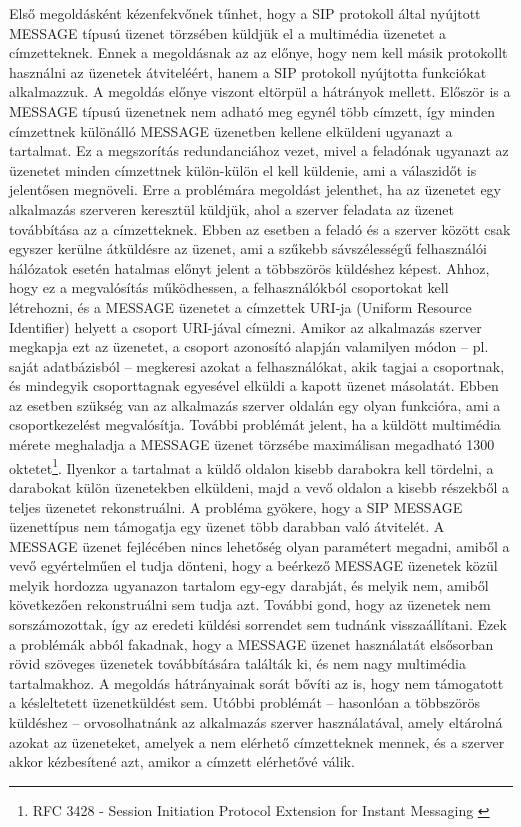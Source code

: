 Első megoldásként kézenfekvőnek tűnhet, hogy a SIP protokoll által nyújtott MESSAGE típusú üzenet törzsében küldjük el a multimédia üzenetet a címzetteknek. Ennek a megoldásnak az az előnye, hogy nem kell másik protokollt használni az üzenetek átviteléért, hanem a SIP protokoll nyújtotta funkciókat alkalmazzuk. A megoldás előnye viszont eltörpül a hátrányok mellett. Először is a MESSAGE típusú üzenetnek nem adható meg egynél több címzett, így minden címzettnek különálló MESSAGE üzenetben kellene elküldeni ugyanazt a tartalmat. Ez a megszorítás redundanciához vezet, mivel a feladónak ugyanazt az üzenetet minden címzettnek külön-külön el kell küldenie, ami a válaszidőt is jelentősen megnöveli. Erre a problémára megoldást jelenthet, ha az üzenetet egy alkalmazás szerveren keresztül küldjük, ahol a szerver feladata az üzenet továbbítása az a címzetteknek. Ebben az esetben a feladó és a szerver között csak egyszer kerülne átküldésre az üzenet, ami a szűkebb sávszélességű felhasználói hálózatok esetén hatalmas előnyt jelent a többszörös küldéshez képest. Ahhoz, hogy ez a megvalósítás működhessen, a felhasználókból csoportokat kell létrehozni, és a MESSAGE üzenetet a címzettek URI-ja (Uniform Resource Identifier) helyett a csoport URI-jával címezni. Amikor az alkalmazás szerver megkapja ezt az üzenetet, a csoport azonosító alapján valamilyen módon -- pl. saját adatbázisból -- megkeresi azokat a felhasználókat, akik tagjai a csoportnak, és mindegyik csoporttagnak egyesével elküldi a kapott üzenet másolatát. Ebben az esetben szükség van az alkalmazás szerver oldalán egy olyan funkcióra, ami a csoportkezelést megvalósítja.
További problémát jelent, ha a küldött multimédia mérete meghaladja a MESSAGE üzenet törzsébe maximálisan megadható 1300 oktetet\footnote{RFC 3428 - Session Initiation Protocol Extension for Instant Messaging \cite{rfc3428}}. Ilyenkor a tartalmat a küldő oldalon kisebb darabokra kell tördelni, a darabokat külön üzenetekben elküldeni, majd a vevő oldalon a kisebb részekből a teljes üzenetet rekonstruálni. A probléma gyökere, hogy a SIP MESSAGE üzenettípus nem támogatja egy üzenet több darabban való átvitelét. A MESSAGE üzenet fejlécében nincs lehetőség olyan paramétert megadni, amiből a vevő egyértelműen el tudja dönteni, hogy a beérkező MESSAGE üzenetek közül melyik hordozza ugyanazon tartalom egy-egy darabját, és melyik nem, amiből következően rekonstruálni sem tudja azt. További gond, hogy az üzenetek nem sorszámozottak, így az eredeti küldési sorrendet sem tudnánk visszaállítani. Ezek a problémák abból fakadnak, hogy a MESSAGE üzenet használatát elsősorban rövid szöveges üzenetek továbbítására találták ki, és nem nagy multimédia tartalmakhoz. 
A megoldás hátrányainak sorát bővíti az is, hogy nem támogatott a késleltetett üzenetküldést sem. Utóbbi problémát -- hasonlóan a többszörös küldéshez -- orvosolhatnánk az alkalmazás szerver használatával, amely eltárolná azokat az üzeneteket, amelyek a nem elérhető címzetteknek mennek, és a szerver akkor kézbesítené azt, amikor a címzett elérhetővé válik.

